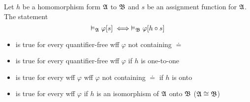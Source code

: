 \begin{theorem}
    \label{thm:HomomorphismTheorem}
    Let $h$ be a homomorphism form $\mathfrak{A}$ to $\mathfrak{B}$ and $s$ be an assignment function for $\mathfrak{A}$. The statement
    \[ \vDash_{\mathfrak{A}}\varphi[s] \iff \vDash_{\mathfrak{B}}\varphi[h \circ s] \]
    \begin{itemize}
        \item is true for every quantifier-free wff $\varphi$ not containing $\doteq$
        \item is true for every quantifier-free wff $\varphi$ if $h$ is one-to-one
        \item is true for every wff $\varphi$ wff $\varphi$ not containing $\doteq$ if $h$ is onto
        \item is true for every wff $\varphi$ if $h$ is an isomorphism of $\mathfrak{A}$ onto $\mathfrak{B}$ ($\mathfrak{A} \cong \mathfrak{B}$)
    \end{itemize}
\end{theorem}
